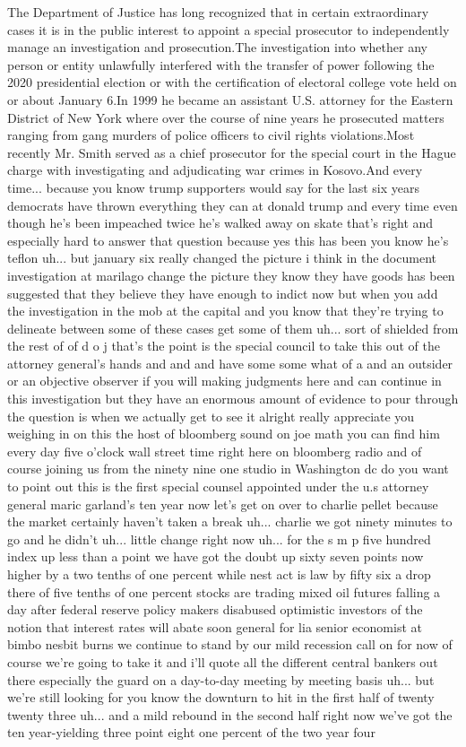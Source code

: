\documentclass{article}%
\begin{document}
The Department of Justice has long recognized that in certain extraordinary cases it is in the public interest to appoint a special prosecutor to independently manage an investigation and prosecution.The investigation into whether any person or entity unlawfully interfered with the transfer of power following the 2020 presidential election or with the certification of electoral college vote held on or about January 6.In 1999 he became an assistant U.S. attorney for the Eastern District of New York where over the course of nine years he prosecuted matters ranging from gang murders of police officers to civil rights violations.Most recently Mr. Smith served as a chief prosecutor for the special court in the Hague charge with investigating and adjudicating war crimes in Kosovo.And every time...  because you know trump supporters would say for the last six years democrats have thrown everything they can at donald trump and every time even though he's been impeached twice he's walked away on skate that's right and especially hard to answer that question because yes this has been you know he's teflon uh... but january six really changed the picture i think in the document investigation at marilago change the picture they know they have goods has been suggested that they believe they have enough to indict now but when you add the investigation in the mob at the capital and you know that they're trying to delineate between some of these cases get some of them uh... sort of shielded from the rest of of d o j that's the point is the special council to take this out of the attorney general's hands and and and have some some what of a and an outsider or an objective observer if you will making judgments here and can continue in this investigation but they have an enormous amount of evidence to pour through the question is when we actually get to see it alright really appreciate you weighing in on this the host of bloomberg sound on joe math you can find him every day five o'clock wall street time right here on bloomberg radio and of course joining us from the ninety nine one studio in Washington dc do you want to point out this is the first special counsel appointed under the u.s attorney general maric garland's ten year now let's get on over to charlie pellet because the market certainly haven't taken a break uh... charlie we got ninety minutes to go and he didn't uh... little change right now uh... for the s m p five hundred index up less than a point we have got the doubt up sixty seven points now higher by a two tenths of one percent while nest act is law by fifty six a drop there of five tenths of one percent stocks are trading mixed oil futures falling a day after federal reserve policy makers disabused optimistic investors of the notion that interest rates will abate soon general for lia senior economist at bimbo nesbit burns we continue to stand by our mild recession call on for now of course we're going to take it and i'll quote all the different central bankers out there especially the guard on a day{-}to{-}day meeting by meeting basis uh... but we're still looking for you know the downturn to hit in the first half of twenty twenty three uh... and a mild rebound in the second half right now we've got the ten year{-}yielding three point eight one percent of the two year four 
\end{document}
